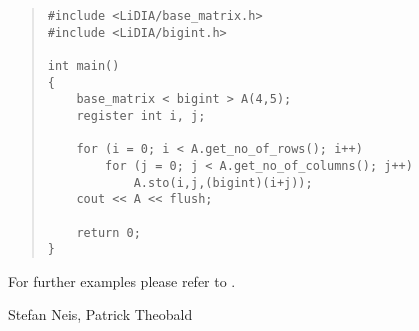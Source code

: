 
\EXAMPLES

\begin{quote}
\begin{verbatim}
#include <LiDIA/base_matrix.h>
#include <LiDIA/bigint.h>

int main()
{
    base_matrix < bigint > A(4,5);
    register int i, j;

    for (i = 0; i < A.get_no_of_rows(); i++)
        for (j = 0; j < A.get_no_of_columns(); j++)
            A.sto(i,j,(bigint)(i+j));
    cout << A << flush;

    return 0;
}
\end{verbatim}
\end{quote}

For further examples please refer to .



\AUTHOR

Stefan Neis, Patrick Theobald
